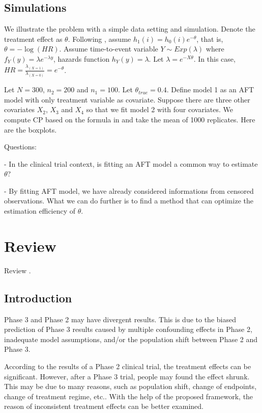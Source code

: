 \documentclass[12pt]{article}
\begin{document}
\subsection{Simulations}

We illustrate the problem with a simple data setting and simulation. Denote the treatment effect as $\theta$. Following \citep{teng2020seamless}, assume $h_{1}(i)=h_{0}(i)e^{-\theta}$, that is, $\theta = -\log(HR)$. Assume time-to-event variable $Y \sim Exp(\lambda)$ where $f_{Y}(y)=\lambda e^{-\lambda y}$, hazards function $h_{Y}(y)=\lambda$. Let $\lambda=e^{-X\theta}$. In this case, $HR=\frac{\lambda_{(X=1)}}{\lambda_{(X=0)}}=e^{-\theta}$.

Let $N=300$, $n_2 = 200$ and $n_1=100$. Let $\theta_{true}=0.4$. Define model 1 as an AFT model with only treatment variable as covariate. Suppose there are three other covariates $X_2$, $X_3$ and $X_4$ so that we fit model 2 with four covariates. We compute CP based on the formula in \citep{teng2020seamless} and take the mean of 1000 replicates. Here are the boxplots.

Questions: 

- In the clinical trial context, is fitting an AFT model a common way to estimate $\theta$?

- By fitting AFT model, we have already considered informations from censored observations. What we can do further is to find a method that can optimize the estimation efficiency of $\theta$.
\section{Review}

Review \citep{qi2019predicting}.

\subsection{Introduction}

Phase 3 and Phase 2 may have divergent results. This is due to the
biased prediction of Phase 3 results caused by multiple confounding
eﬀects in Phase 2, inadequate model assumptions, and/or the population
shift between Phase 2 and Phase 3.

According to the results of a Phase 2 clinical trial, the treatment
effects can be signiﬁcant. However, after a Phase 3 trial, people may
found the eﬀect shrunk. This may be due to many reasons, such as
population shift, change of endpoints, change of treatment regime,
etc.. With the help of the proposed framework, the reason of
inconsistent treatment eﬀects can be better examined.
\end{document}
